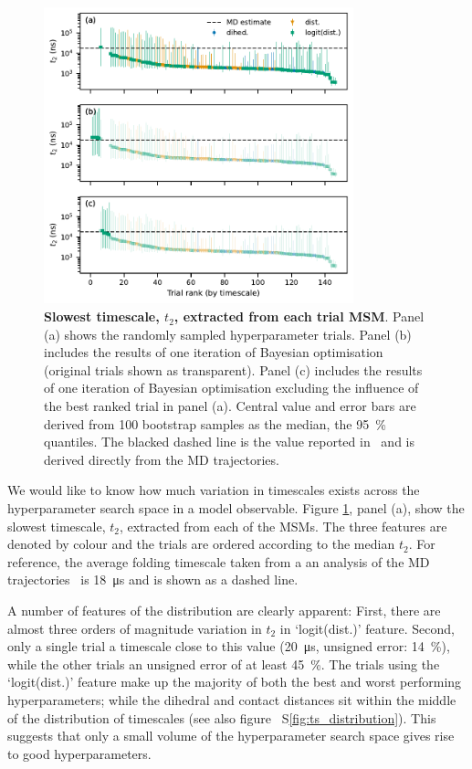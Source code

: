 \documentclass[journal=jacsat,manuscript=article]{achemso}
\newcommand*\sref[1]{%
    S\ref{#1}}
\begin{document}
\begin{figure}
    \centering
    \includegraphics[width=0.8\textwidth]{figures/1fme_timescales.pdf}
    \caption{\textbf{Slowest timescale, $t_{2}$, extracted from each trial MSM}. Panel (a) shows the randomly sampled hyperparameter trials. Panel (b) includes the results of one iteration of Bayesian optimisation (original trials shown as transparent). Panel (c) includes the results of one iteration of Bayesian optimisation excluding the influence of the best ranked trial in panel (a).  Central value and error bars are derived from 100 bootstrap samples as the median, the \SI{95}{\percent} quantiles. The blacked dashed line is the value  reported in~\cite{lindorff-larsen_how_2011} and is derived directly from the MD trajectories.} 
    \label{fig:1fme_timescales}
\end{figure}

We would like to know how much variation in timescales exists across the hyperparameter search space in a model observable. Figure \ref{fig:1fme_timescales}, panel (a), show the slowest timescale, $t_2$, extracted from each of the MSMs. The three features are denoted by colour and the trials are ordered according to the median $t_2$. For reference, the average folding timescale taken from a an analysis of the MD trajectories~\cite{lindorff-larsen_how_2011} is \SI{18}{\micro\second} and is shown as a dashed line.  

A number of features of the distribution are clearly apparent: First, there are almost three orders of magnitude variation in $t_2$ in `logit(dist.)' feature. Second, only a single trial  a timescale close to this value (\SI{20}{\micro\second}, unsigned error: \SI{14}{\percent}), while the other trials an unsigned error of  at least \SI{45}{\percent}. The trials using the `logit(dist.)' feature make up the majority of both the best and worst performing hyperparameters; while the dihedral and contact distances sit within the middle of the distribution of timescales (see also figure~\sref{fig:ts_distribution}). This suggests that only a small volume of the hyperparameter search space gives rise to good hyperparameters.  
\end{document}
